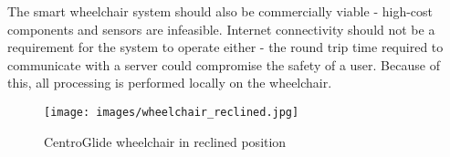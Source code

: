 The smart wheelchair system should also be commercially viable - high-cost
components and sensors are infeasible. Internet connectivity should not be a requirement
for the system to operate either - the round trip time required to communicate with a server
could compromise the safety of a user. Because of this, all processing is performed locally
on the wheelchair.

\begin{figure}[H]
    \centering
    \texttt{[image: images/wheelchair\_reclined.jpg]}
    \caption{CentroGlide wheelchair in reclined position}
    \label{fig:wheelchair_reclined}
\end{figure}
